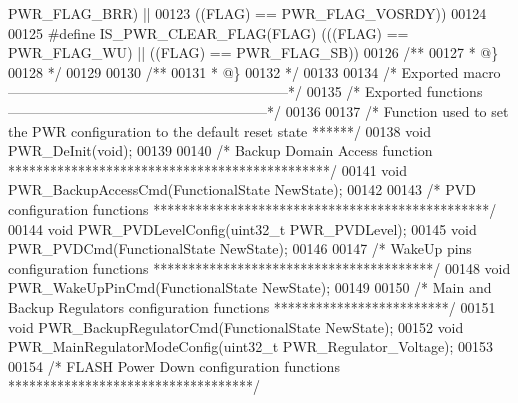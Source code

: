 \begin{DoxyCode}
      PWR_FLAG_BRR\textcolor{preprocessor}{)} \textcolor{preprocessor}{||}
00123                                \textcolor{preprocessor}{(}\textcolor{preprocessor}{(}\textcolor{preprocessor}{FLAG}\textcolor{preprocessor}{)} \textcolor{preprocessor}{==} PWR_FLAG_VOSRDY\textcolor{preprocessor}{)}\textcolor{preprocessor}{)}
00124 
00125 \textcolor{preprocessor}{#}\textcolor{preprocessor}{define} \textcolor{preprocessor}{IS\_PWR\_CLEAR\_FLAG}\textcolor{preprocessor}{(}\textcolor{preprocessor}{FLAG}\textcolor{preprocessor}{)} \textcolor{preprocessor}{(}\textcolor{preprocessor}{(}\textcolor{preprocessor}{(}\textcolor{preprocessor}{FLAG}\textcolor{preprocessor}{)} \textcolor{preprocessor}{==} PWR_FLAG_WU\textcolor{preprocessor}{)} \textcolor{preprocessor}{||} \textcolor{preprocessor}{(}\textcolor{preprocessor}{(}\textcolor{preprocessor}{FLAG}\textcolor{preprocessor}{)} \textcolor{preprocessor}{==} 
      PWR_FLAG_SB\textcolor{preprocessor}{)}\textcolor{preprocessor}{)}
00126 \textcolor{comment}{/**}
00127 \textcolor{comment}{  * @\}}
00128 \textcolor{comment}{  */}
00129 
00130 \textcolor{comment}{/**}
00131 \textcolor{comment}{  * @\}}
00132 \textcolor{comment}{  */}
00133 
00134 \textcolor{comment}{/* Exported macro ------------------------------------------------------------*/}
00135 \textcolor{comment}{/* Exported functions --------------------------------------------------------*/}
00136 
00137 \textcolor{comment}{/* Function used to set the PWR configuration to the default reset state ******/}
00138 \textcolor{keywordtype}{void} PWR_DeInit(\textcolor{keywordtype}{void});
00139 
00140 \textcolor{comment}{/* Backup Domain Access function **********************************************/}
00141 \textcolor{keywordtype}{void} PWR_BackupAccessCmd(FunctionalState NewState);
00142 
00143 \textcolor{comment}{/* PVD configuration functions ************************************************/}
00144 \textcolor{keywordtype}{void} PWR_PVDLevelConfig(uint32\_t PWR\_PVDLevel);
00145 \textcolor{keywordtype}{void} PWR_PVDCmd(FunctionalState NewState);
00146 
00147 \textcolor{comment}{/* WakeUp pins configuration functions ****************************************/}
00148 \textcolor{keywordtype}{void} PWR_WakeUpPinCmd(FunctionalState NewState);
00149 
00150 \textcolor{comment}{/* Main and Backup Regulators configuration functions *************************/}
00151 \textcolor{keywordtype}{void} PWR_BackupRegulatorCmd(FunctionalState NewState);
00152 \textcolor{keywordtype}{void} PWR_MainRegulatorModeConfig(uint32\_t PWR\_Regulator\_Voltage);
00153 
00154 \textcolor{comment}{/* FLASH Power Down configuration functions ***********************************/}

\end{DoxyCode}
